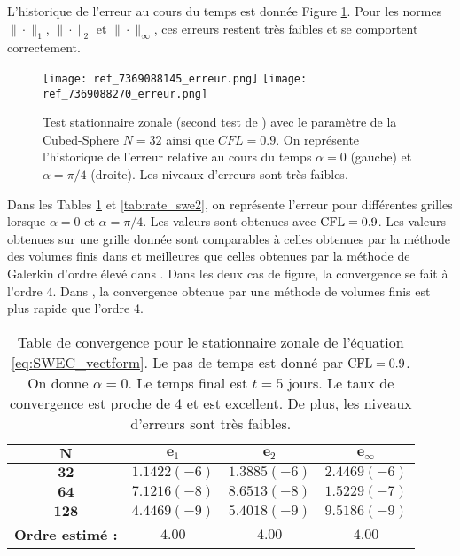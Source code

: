 L'historique de l'erreur au cours du temps est donnée Figure \ref{fig: williamson 2 erreur}. Pour les normes $\| \cdot \|_1$, $\| \cdot \|_2$ et $\| \cdot \|_{\infty}$, ces erreurs restent très faibles et se comportent correctement.

\begin{figure}[htbp]
\begin{center}
\texttt{[image: ref\_7369088145\_erreur.png]}
\texttt{[image: ref\_7369088270\_erreur.png]}
\end{center}
\caption{Test stationnaire zonale (second test de \cite{Williamson1992}) avec le paramètre de la Cubed-Sphere $N=32$ ainsi que $CFL=0.9$. On représente l'historique de l'erreur relative au cours du temps $\alpha = 0$ (gauche) et $\alpha = \pi/4$ (droite). Les niveaux d'erreurs sont très faibles.}
\label{fig: williamson 2 erreur}
\end{figure}

Dans les Tables \ref{tab:rate_swe1} et \ref{tab:rate_swe2}, on représente l'erreur pour différentes grilles lorsque $\alpha = 0$ et $\alpha = \pi/4$. Les valeurs sont obtenues avec $\text{CFL} = 0.9$. Les valeurs obtenues sur une grille donnée sont comparables à celles obtenues par la méthode des volumes finis dans \cite{Chen2008} et meilleures que celles obtenues par la méthode de Galerkin d'ordre élevé dans \cite{Kuang2016}. Dans les deux cas de figure, la convergence se fait à l'ordre 4. Dans \cite{Ullrich2011}, la convergence obtenue par une méthode de volumes finis est plus rapide que l'ordre 4. 

\begin{table}[htbp]
\begin{center}
\begin{tabular}{|c||c|c|c|}
\hline 
$\mathbf{N}$ & $\mathbf{e}_1$ & $\mathbf{e}_2$ & $\mathbf{e}_{\infty}$\\ 
\hline 
\hline 
$\mathbf{32}$ & $1.1422(-6)$ & $1.3885(-6)$ & $2.4469(-6)$\\ 

$\mathbf{64}$ & $7.1216(-8)$ & $8.6513(-8)$ & $1.5229(-7)$\\ 

$\mathbf{128}$ & $4.4469(-9)$ & $5.4018(-9)$ & $9.5186(-9)$\\

\hline
\textbf{Ordre estimé :} & $4.00$ & $4.00$ & $4.00$\\ 
\hline
\end{tabular} 
\end{center}
\caption{Table de convergence pour le stationnaire zonale de l'équation \eqref{eq:SWEC_vectform}. Le pas de temps est donné par $\text{CFL}=0.9$. On donne $\alpha = 0$. Le temps final est $t=5$ jours. Le taux de convergence est proche de 4 et est excellent. De plus, les niveaux d'erreurs sont très faibles.}
\label{tab:rate_swe1}
\end{table}

